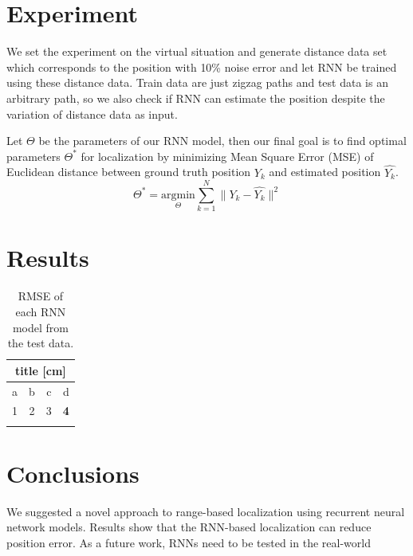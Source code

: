 \documentclass[letterpaper, 10 pt, conference]{ieeeconf}  %
\begin{document}
\section{Experiment}

 We set the experiment on the virtual situation and generate distance data set which corresponds to the position with 10\% noise error and let RNN be trained using these distance data. Train data are just zigzag paths and test data is an arbitrary path, so we also check if RNN can estimate the position despite the variation of distance data as input.
   
 Let $\Theta$ be the parameters of our RNN model, then our final goal is to find optimal parameters $\Theta^{*}$ for localization by minimizing Mean Square Error (MSE) of Euclidean distance between ground truth position $Y_k$ and estimated position $\hat{Y_k}$.
\begin{equation}
\Theta^{*} = \underset{\Theta}{\mathrm{argmin}} \sum_{k=1}^N \parallel Y_k - \hat{Y_k} \parallel^{2}
\end{equation}  

\section{Results}
 
\begin{table}[h]
	\centering
	\caption{RMSE of each RNN model from the test data.}
	\begin{tabular}{cccc}
		\hline
		\multicolumn{4}{c}{title {[}cm{]}}                                          \\ \hline
		a                 & b              & c                  & d        \\
		1               & 2              & 3                    & \textbf{4}                    \\ \hline
		\multicolumn{1}{l}{} & \multicolumn{1}{l}{} & \multicolumn{1}{l}{} & \multicolumn{1}{l}{}
		
	\end{tabular}
	
	\label{table:rmse}
	
\end{table}

\section{Conclusions}

We suggested a novel approach to range-based localization using recurrent neural network models. Results show that the RNN-based localization can reduce position error. As a future work, RNNs need to be tested in the real-world



\end{document}
